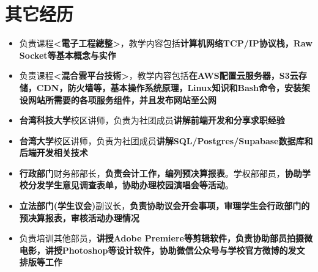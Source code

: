 \documentclass{resume}
\newcommand{\iconsection}[2]{
  \section[\texorpdfstring{#2}{#2}]{\faIcon{#1}\quad #2}
}
\begin{document}
\iconsection{history}{其它经历}
        \begin{itemize}
            \item 负责课程\textbf{<電子工程總整>}，教学内容包括\textbf{计算机网络TCP/IP协议栈，Raw Socket等基本概念与实作}
            \item 负责课程\textbf{<混合雲平台技術>}，教学内容包括\textbf{在AWS配置云服务器，S3云存储，CDN，防火墙等，基本操作系统原理，Linux知识和Bash命令，安装架设网站所需要的各项服务组件，并且发布网站至公网}
        \end{itemize}
        \begin{itemize}
            \item \textbf{台湾科技大学}校区讲师，负责为社团成员\textbf{讲解前端开发和分享求职经验}
            \item \textbf{台湾大学}校区讲师，负责为社团成员\textbf{讲解SQL/Postgres/Supabase数据库和后端开发相关技术}
        \end{itemize}
        \begin{itemize}
            \item \textbf{行政部门}财务部部长，\textbf{负责会计工作，编列预决算报表}。学权部部员，\textbf{协助学校分发学生意见调查表单，协助办理校园演唱会等活动}。
            \item \textbf{立法部门(学生议会)}副议长，\textbf{负责协助议会开会事项，审理学生会行政部门的预决算报表，审核活动办理情况}
        \end{itemize}
        \begin{itemize}
            \item 负责培训其他部员，\textbf{讲授Adobe Premiere等剪辑软件，负责协助部员拍摄微电影，讲授Photoshop等设计软件，协助微信公众号与学校官方微博的发文排版等工作}
        \end{itemize}
\end{document}
